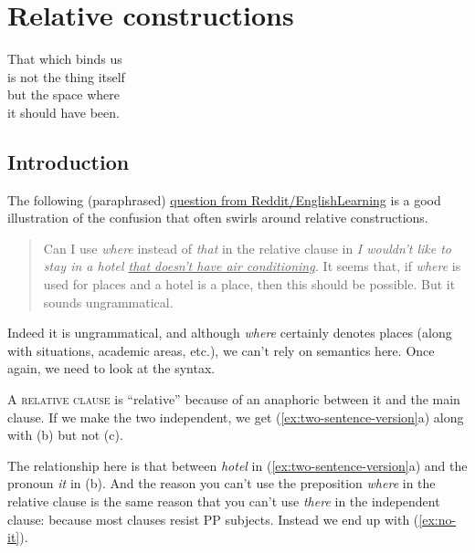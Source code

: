 \chapter{Relative constructions} \label{ch:relatives}

\epigraph{That which binds us\\
is not the thing itself\\
but the space where\\
it should have been.}{}

\section{Introduction}

The following (paraphrased) \href{https://www.reddit.com/r/EnglishLearning/comments/1b03e2u/relative_pronouns_i_wouldnt_like_to_stay_in_a/}{question from Reddit/EnglishLearning} is a good illustration of the confusion that often swirls around relative constructions.

\begin{quote}
    Can I use \textit{where} instead of \textit{that} in the relative clause in \textit{I wouldn't like to stay in a hotel \uline{that doesn't have air conditioning}.} It seems that, if \textit{where} is used for places and a hotel is a place, then this should be possible. But it sounds ungrammatical.
\end{quote}

Indeed it is ungrammatical, and although \textit{where} certainly denotes places (along with situations, academic areas, etc.), we can't rely on semantics here. Once again, we need to look at the syntax.

A \textsc{relative clause} is ``relative'' because of an anaphoric  between it and the main clause. If we make the two independent, we get (\ref{ex:two-sentence-version}a) along with (b) but not (c).

\ea\label{ex:two-sentence-version}
    \z
\z

The relationship here is that between \textit{hotel} in (\ref{ex:two-sentence-version}a) and the pronoun \textit{it} in (b). And the reason you can't use the preposition \textit{where} in the relative clause is the same reason that you can't use \textit{there} in the independent clause: because most clauses resist PP subjects. Instead we end up with (\ref{ex:no-it}).

